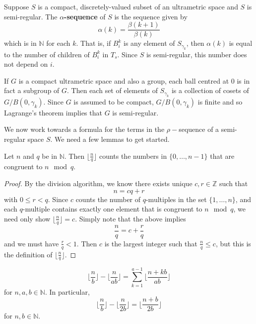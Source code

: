 \begin{definition}
Suppose $S$ is a compact, discretely-valued subset of an ultrametric space and $S$ is semi-regular. The \textbf{$\alpha$-sequence} of $S$ is the sequence given by \[\alpha(k)=\frac{\beta(k+1)}{\beta(k)}\] which is in $\mathbb{N}$ for each $k$. That is, if $B^k_i$ is any element of $S_{\gamma_k}$, then $\alpha(k)$ is equal to the number of children of $B^k_i$ in $T_s$. Since $S$ is semi-regular, this number does not depend on $i$.
\end{definition}

\begin{example}
\label{lagrange}	
	If $G$ is a compact ultrametric space and also a group, each ball centred at $0$ is in fact a subgroup of $G$. Then each set of elements of $S_{\gamma_k}$ is a collection of cosets of $G/B(0,\gamma_k)$. Since $G$ is assumed to be compact, $G/B(0,\gamma_k)$ is finite and so Lagrange's theorem implies that $G$ is semi-regular.
\end{example}

We now work towards a formula for the terms in the $\rho-$sequence of a semi-regular space $S$. We need a few lemmas to get started.\\
 
\begin{lemma}
Let $n$ and $q$ be in $\mathbb{N}$. Then $\lfloor\frac{n}{q} \rfloor$ counts the numbers in $\{0,\ldots, n-1\}$ that are congruent to $n \mod q$.
\end{lemma}

\begin{proof}
By the division algorithm, we know there exists unique $c,r \in \mathbb{Z}$ such that \[n = cq + r\] with $0 \leq r < q$. Since $c$ counts the number of $q$-multiples in the set $\{1,\ldots,n\}$, and each $q$-multiple contains exactly one element that is congruent to $n \mod q$, we need only show $\lfloor\frac{n}{q} \rfloor = c$. Simply note that the above implies  \[\frac{n}{q} = c + \frac{r}{q}\] and we must have   $\frac{r}{q} < 1$. Then $c$ is the largest integer such that $\frac{n}{q} \leq c$, but this is the definition of $\lfloor\frac{n}{q} \rfloor$.
\end{proof}


\begin{lemma}
\label{semi-regular formula}
\[\lfloor\frac{n}{b} \rfloor - \lfloor \frac{n}{ab} \rfloor = \sum_{k=1}^{a-1} \lfloor \frac{n + kb}{ab} \rfloor\] for $n,a,b \in \mathbb{N}$. In particular, 
\[\lfloor\frac{n}{b} \rfloor - \lfloor \frac{n}{2b} \rfloor= \lfloor \frac{n+b}{2b} \rfloor\] for  $n,b \in \mathbb{N}$.
\end{lemma}


